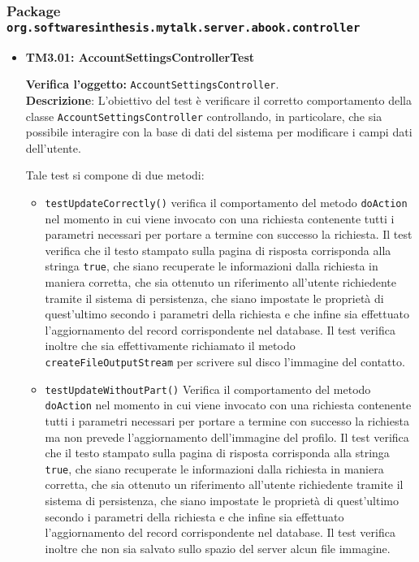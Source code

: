 \subsubsection{Package \texttt{org.softwaresinthesis.mytalk.server.abook.controller}}
\begin{itemize}

\item \textbf{TM3.01: AccountSettingsControllerTest}

\textbf{Verifica l'oggetto:} \texttt{AccountSettingsController}.\\
\textbf{Descrizione}: L'obiettivo del test è verificare il corretto comportamento della classe \texttt{AccountSettingsController} controllando, in particolare, che sia possibile interagire con la base di dati del sistema per modificare i campi dati dell'utente.

Tale test si compone di due metodi:
\begin{itemize}
\item \texttt{testUpdateCorrectly()} verifica il comportamento del metodo \texttt{doAction} nel momento in cui viene invocato con una richiesta contenente tutti i parametri necessari per portare a termine con successo la richiesta. Il test verifica che il testo stampato sulla pagina di risposta corrisponda alla stringa \texttt{true}, che siano recuperate le informazioni dalla richiesta in maniera corretta, che sia ottenuto un riferimento all'utente richiedente tramite il sistema di persistenza, che siano impostate le proprietà di quest'ultimo secondo i parametri della richiesta e che infine sia effettuato l'aggiornamento del record corrispondente nel database. Il test verifica inoltre che sia effettivamente richiamato il metodo \texttt{createFileOutputStream} per scrivere sul disco l'immagine del contatto.

\item \texttt{testUpdateWithoutPart()} Verifica il comportamento del metodo \texttt{doAction} nel momento in cui viene invocato con una richiesta contenente tutti i parametri necessari per portare a termine con successo la richiesta ma non prevede l'aggiornamento dell'immagine del profilo. Il test verifica che il testo stampato sulla pagina di risposta corrisponda alla stringa \texttt{true}, che siano recuperate le informazioni dalla richiesta in maniera corretta, che sia ottenuto un riferimento all'utente richiedente tramite il sistema di persistenza, che siano impostate le proprietà di quest'ultimo secondo i parametri della richiesta e che infine sia effettuato l'aggiornamento del record corrispondente nel database. Il test verifica inoltre che non sia salvato sullo spazio del server alcun file immagine.


\end{itemize}
\end{itemize}
